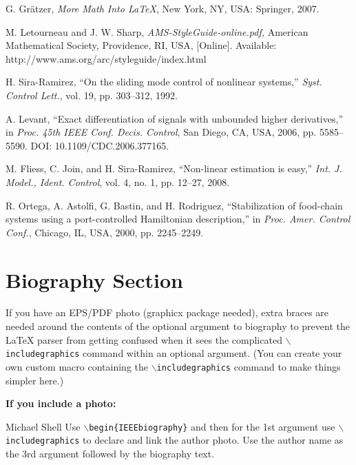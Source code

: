 \documentclass[lettersize,journal]{IEEEtran}
\begin{document}
\begin{thebibliography}{1}
  G. Gr\"atzer, {\it{More Math Into LaTeX}}, New York, NY, USA: Springer, 2007.

  M. Letourneau and J. W. Sharp, {\it{AMS-StyleGuide-online.pdf,}} American Mathematical Society, Providence, RI, USA, [Online]. Available: http://www.ams.org/arc/styleguide/index.html

  H. Sira-Ramirez, ``On the sliding mode control of nonlinear systems,'' \textit{Syst. Control Lett.}, vol. 19, pp. 303--312, 1992.

  A. Levant, ``Exact differentiation of signals with unbounded higher derivatives,''  in \textit{Proc. 45th IEEE Conf. Decis.
    Control}, San Diego, CA, USA, 2006, pp. 5585--5590. DOI: 10.1109/CDC.2006.377165.

  M. Fliess, C. Join, and H. Sira-Ramirez, ``Non-linear estimation is easy,'' \textit{Int. J. Model., Ident. Control}, vol. 4, no. 1, pp. 12--27, 2008.

  R. Ortega, A. Astolfi, G. Bastin, and H. Rodriguez, ``Stabilization of food-chain systems using a port-controlled Hamiltonian description,'' in \textit{Proc. Amer. Control Conf.}, Chicago, IL, USA,
  2000, pp. 2245--2249.

\end{thebibliography}

\newpage

\section{Biography Section}
If you have an EPS/PDF photo (graphicx package needed), extra braces are needed
around the contents of the optional argument to biography to prevent the LaTeX
parser from getting confused when it sees the complicated
$\backslash${\tt{includegraphics}} command within an optional argument. (You
can create your own custom macro containing the
$\backslash${\tt{includegraphics}} command to make things simpler here.)

\vspace{11pt}

\bf{If you include a photo:}\vspace{-33pt}
\begin{IEEEbiography}{Michael Shell}
  Use $\backslash${\tt{begin\{IEEEbiography\}}} and then for the 1st argument use $\backslash${\tt{includegraphics}} to declare and link the author photo.
  Use the author name as the 3rd argument followed by the biography text.
\end{IEEEbiography}
\end{document}
